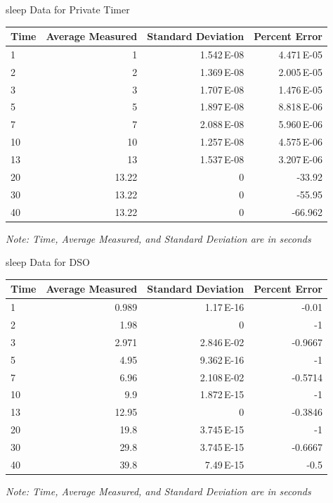 \documentclass[pdf]{beamer}
\begin{document}
\begin{frame}{sleep Data for Private Timer}
  \begin{center}
    \begin{tabular}{lrrr}
      Time & Average Measured & Standard Deviation & Percent Error\\
      \hline
      1 & 1 & 1.542\,E-08 & 4.471\,E-05\\
      2 & 2 & 1.369\,E-08 & 2.005\,E-05\\
      3 & 3 & 1.707\,E-08 & 1.476\,E-05\\
      5 & 5 & 1.897\,E-08 & 8.818\,E-06\\
      7 & 7 & 2.088\,E-08 & 5.960\,E-06\\
      10 & 10 & 1.257\,E-08 & 4.575\,E-06\\
      13 & 13 & 1.537\,E-08 & 3.207\,E-06\\
      20 & 13.22 & 0 & -33.92\\
      30 & 13.22 & 0 & -55.95\\
      40 & 13.22 & 0 & -66.962\\
      \hline
    \end{tabular}
  \end{center}
  \small\emph{Note: Time, Average Measured, and Standard Deviation are in seconds}

\end{frame}

\begin{frame}{sleep Data for DSO}

  \begin{center}
    \begin{tabular}{lrrr}
      Time & Average Measured & Standard Deviation & Percent Error\\
      \hline
      1 & 0.989 & 1.17\,E-16 & -0.01\\
      2 & 1.98 & 0 & -1\\
      3 & 2.971 & 2.846\,E-02 & -0.9667\\
      5 & 4.95 & 9.362\,E-16 & -1\\
      7 & 6.96 & 2.108\,E-02 & -0.5714\\
      10 & 9.9 & 1.872\,E-15 & -1\\
      13 & 12.95 & 0 & -0.3846\\
      20 & 19.8 & 3.745\,E-15 & -1\\
      30 & 29.8 & 3.745\,E-15 & -0.6667\\
      40 & 39.8 & 7.49\,E-15 & -0.5\\
      \hline
    \end{tabular}
  \end{center}
  \small\emph{Note: Time, Average Measured, and Standard Deviation are in seconds}

\end{frame}
\end{document}
